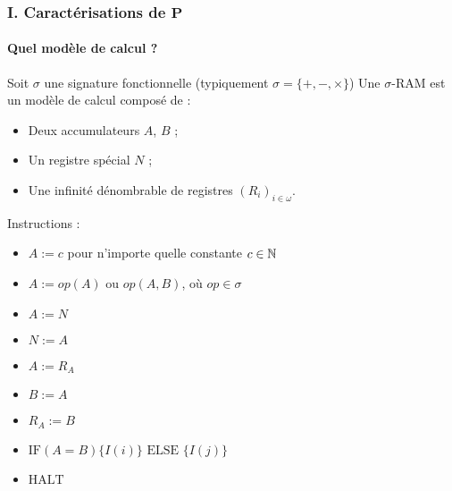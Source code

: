 \documentclass[10pt]{beamer}
\begin{document}
	
	
	
	\begin{frame}
		\frametitle{I. Caractérisations de $\textbf{P}$}
		\framesubtitle{Quel modèle de calcul ?}

		\begin{defn}
			Soit $\sigma$ une signature fonctionnelle (typiquement $\sigma = \{+, - , \times\}$)
			Une $\sigma$-RAM est un modèle de calcul composé de :
			
			\begin{itemize}[itemsep=-1mm]
				\item	Deux accumulateurs $A$, $B$ ;
				\item 	Un registre spécial $N$ ;
				\item 	Une infinité dénombrable de registres $\left( R_i\right)_{i \in \omega}$.
			\end{itemize}
			
			
			
			Instructions :
			
			\begin{itemize}[itemsep=-1mm]
				\item 	$A := c$ pour n'importe quelle constante $c \in \mathbb{N}$
				\item 	$A := op(A)$ ou $op(A,B)$, où $op \in \sigma$
				\item 	$A := N$ 
				\item 	$N := A$
				\item 	$A := R_A$
				\item 	$B := A$ 
				\item 	$R_A := B$
				\item 	$\text{IF} (A=B) \{I( i)\} \text{ ELSE } \{I( j )\}$
				\item 	$\text{HALT}$
			\end{itemize}	
		\end{defn}
		
	\end{frame}
	
\end{document}
